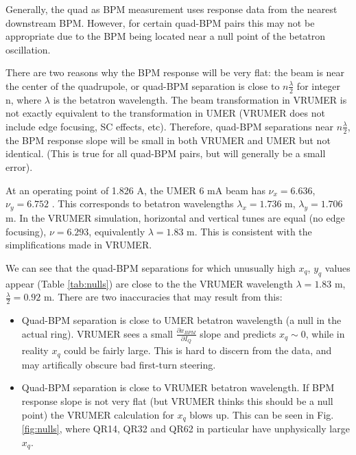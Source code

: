 Generally, the quad as BPM measurement uses response data from the nearest downstream BPM. However, for certain quad-BPM pairs this may not be appropriate due to the BPM being located near a null point of the betatron oscillation. 

There are two reasons why the BPM response will be very flat: the beam is near the center of the quadrupole, or quad-BPM separation is close to $n \frac{\lambda}{2}$ for integer n, where $\lambda$ is the betatron wavelength. The beam transformation in VRUMER is not exactly equivalent to the transformation in UMER (VRUMER does not include edge focusing, SC effects, etc). Therefore, quad-BPM separations near $n \frac{\lambda}{2}$, the BPM response slope will be small in both VRUMER and UMER but not identical. (This is true for all quad-BPM pairs, but will generally be a small error). 

At an operating point of 1.826 A, the UMER 6 mA beam has $\nu_x = 6.636$, $\nu_y=6.752$ \cite{RKnote:2010}. This corresponds to betatron wavelengths $\lambda_x = 1.736$ m, $\lambda_y=1.706$ m.
In the VRUMER simulation, horizontal and vertical tunes are equal (no edge focusing), $\nu=6.293$, equivalently $\lambda = 1.83$ m. This is consistent with the simplifications made in VRUMER. 

We can see that the quad-BPM separations for which unusually high $x_q$, $y_q$ values appear (Table \ref{tab:nulls}) are close to the the VRUMER wavelength $\lambda = 1.83$ m, $\frac{\lambda}{2} = 0.92$ m. There are two inaccuracies that may result from this:

\begin{itemize}
\item Quad-BPM separation is close to UMER betatron wavelength (a null in the actual ring). VRUMER sees a small $\frac{\partial x_{BPM}}{\partial I_Q}$ slope and predicts $x_q \sim 0$, while in reality $x_q$ could be fairly large. This is hard to discern from the data, and may artifically obscure bad first-turn steering.
\item Quad-BPM separation is close to VRUMER betatron wavelength. If BPM response slope is not very flat (but VRUMER thinks this should be a null point) the VRUMER calculation for $x_q$ blows up. This can be seen in Fig. \ref{fig:nulls}, where QR14, QR32 and QR62 in particular have unphysically large $x_q$.  
\end{itemize}



